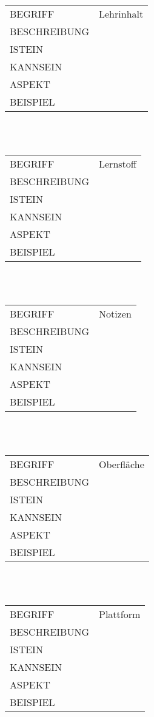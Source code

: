 \documentclass[12pt,a4paper]{article}
\begin{document}
\begin{tabular}{l p{10cm}}
BEGRIFF 	 & Lehrinhalt \\ 
BESCHREIBUNG & \\ 
ISTEIN   	 & \\
KANNSEIN 	 & \\ 
ASPEKT   	 & \\
BEISPIEL 	 & \\
\hline
\end{tabular}\\\\  

\begin{tabular}{l p{10cm}}
BEGRIFF 	 & Lernstoff \\ 
BESCHREIBUNG & \\ 
ISTEIN   	 & \\
KANNSEIN 	 & \\ 
ASPEKT   	 & \\
BEISPIEL 	 & \\
\hline
\end{tabular}\\\\ 

\begin{tabular}{l p{10cm}} 
BEGRIFF 	 & Notizen \\ 
BESCHREIBUNG & \\ 
ISTEIN   	 & \\
KANNSEIN 	 & \\ 
ASPEKT   	 & \\
BEISPIEL 	 & \\
\hline
\end{tabular}\\\\  

\begin{tabular}{l p{10cm}}
BEGRIFF 	 & Oberfläche \\ 
BESCHREIBUNG & \\ 
ISTEIN   	 & \\
KANNSEIN 	 & \\ 
ASPEKT   	 & \\
BEISPIEL 	 & \\
\hline
\end{tabular}\\\\  

\begin{tabular}{l p{10cm}}
BEGRIFF 	 & Plattform \\ 
BESCHREIBUNG & \\ 
ISTEIN   	 & \\
KANNSEIN 	 & \\ 
ASPEKT   	 & \\
BEISPIEL 	 & \\
\hline
\end{tabular}\\\\  
\end{document}

